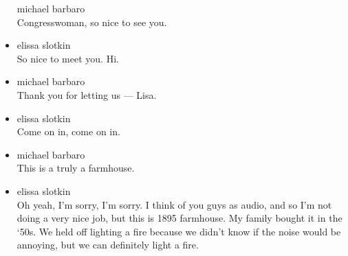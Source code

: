 \begin{itemize}
  michael barbaro\\
  Congresswoman, so nice to see you.
\item
  elissa slotkin\\
  So nice to meet you. Hi.
\item
  michael barbaro\\
  Thank you for letting us --- Lisa.
\item
  elissa slotkin\\
  Come on in, come on in.
\item
  michael barbaro\\
  This is a truly a farmhouse.
\item
  elissa slotkin\\
  Oh yeah, I'm sorry, I'm sorry. I think of you guys as audio, and so
  I'm not doing a very nice job, but this is 1895 farmhouse. My family
  bought it in the `50s. We held off lighting a fire because we didn't
  know if the noise would be annoying, but we can definitely light a
  fire.


\end{itemize}
